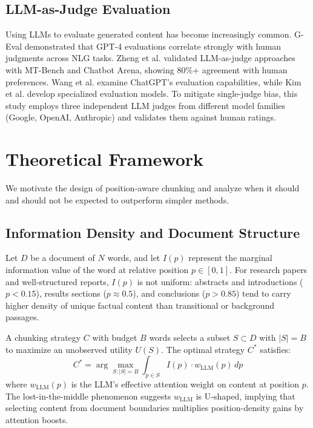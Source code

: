 \documentclass[journal]{IEEEtran}
\begin{document}
\subsection{LLM-as-Judge Evaluation}

Using LLMs to evaluate generated content has become increasingly common. G-Eval \cite{liu2023geval} demonstrated that GPT-4 evaluations correlate strongly with human judgments across NLG tasks. Zheng et al. \cite{zheng2023judging} validated LLM-as-judge approaches with MT-Bench and Chatbot Arena, showing 80\%+ agreement with human preferences. Wang et al. \cite{wang2023chatgpt} examine ChatGPT's evaluation capabilities, while Kim et al. \cite{kim2024prometheus} develop specialized evaluation models. To mitigate single-judge bias, this study employs three independent LLM judges from different model families (Google, OpenAI, Anthropic) and validates them against human ratings.

\section{Theoretical Framework}
\label{sec:theory}

We motivate the design of position-aware chunking and analyze when it should and should not be expected to outperform simpler methods.

\subsection{Information Density and Document Structure}

Let $D$ be a document of $N$ words, and let $I(p)$ represent the marginal information value of the word at relative position $p \in [0, 1]$. For research papers and well-structured reports, $I(p)$ is not uniform: abstracts and introductions ($p < 0.15$), results sections ($p \approx 0.5$), and conclusions ($p > 0.85$) tend to carry higher density of unique factual content than transitional or background passages.

A chunking strategy $C$ with budget $B$ words selects a subset $S \subset D$ with $|S| = B$ to maximize an unobserved utility $U(S)$. The optimal strategy $C^*$ satisfies:
\begin{equation}
C^* = \arg\max_{S : |S| = B} \int_{p \in S} I(p) \cdot w_{\text{LLM}}(p)\, dp
\end{equation}
where $w_{\text{LLM}}(p)$ is the LLM's effective attention weight on content at position $p$. The lost-in-the-middle phenomenon \cite{liu2024lost} suggests $w_{\text{LLM}}$ is U-shaped, implying that selecting content from document boundaries multiplies position-density gains by attention boosts.
\end{document}
